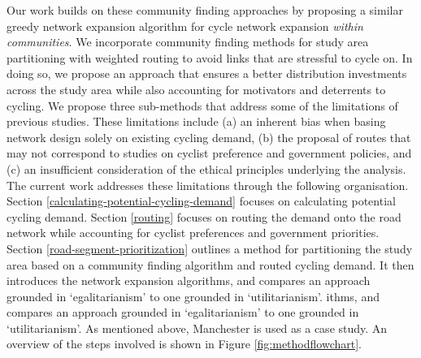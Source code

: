 \documentclass[
]{article}
\begin{document}
Our work builds on these community finding approaches by proposing a similar greedy network expansion algorithm for cycle network expansion \emph{within communities}.
We incorporate community finding methods for study area partitioning with weighted routing to avoid links that are stressful to cycle on.
In doing so, we propose an approach that ensures a better distribution investments across the study area while also accounting for motivators and deterrents to cycling.
We propose three sub-methods that address some of the limitations of previous studies.
These limitations include (a) an inherent bias when basing network design solely on existing cycling demand, (b) the proposal of routes that may not correspond to studies on cyclist preference and government policies, and (c) an insufficient consideration of the ethical principles underlying the analysis.
The current work addresses these limitations through the following organisation.
Section \ref{calculating-potential-cycling-demand} focuses on calculating potential cycling demand.
Section \ref{routing} focuses on routing the demand onto the road network while accounting for cyclist preferences and government priorities.
Section \ref{road-segment-prioritization} outlines a method for partitioning the study area based on a community finding algorithm and routed cycling demand.
It then introduces the network expansion algorithms, and compares an approach grounded in `egalitarianism' to one grounded in `utilitarianism'. ithms, and compares an approach grounded in
`egalitarianism' to one grounded in `utilitarianism'. As mentioned above, Manchester is used as a case study.
An overview of the steps involved is shown in Figure \ref{fig:methodflowchart}.
\end{document}
